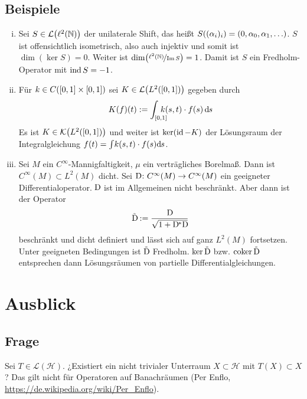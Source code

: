\subsection[Beispiele für Fredholm-Operatoren]{Beispiele} %
\label{sub:95}
\begin{enumerate}[(i)]
	\item Sei $S \in \mathcal{L}\enbrace*{\ell^2(\mathds{N})}$ der unilaterale Shift, das heißt
	$S \enbrace*{(\alpha_i)_i}= (0, \alpha_0, \alpha_1, \ldots )$. $S$ ist offensichtlich isometrisch, also auch injektiv und somit ist $\dim (\ker S)=0$. Weiter ist
	$\dim \enbrace*{\nicefrac{\ell^2(\mathds{N})}{\im S}} =1$. Damit ist $S$ ein Fredholm-Operator mit $\operatorname{ind} S = -1$.
	\item Für $k \in C \enbrace*{[0,1] \times [0,1]}$ sei $K \in \mathcal{L} \enbrace*{L^2([0,1])}$ gegeben durch
	\[
		K(f)(t) := \int_{[0,1]}\hspace{-1em} k(s,t)\cdot f(s)\,\mathrm{d}\mkern-1.0mu s
	\]
	Es ist $K \in \mathcal{K} \enbrace*{L^2([0,1])}$ und weiter ist $\ker(\operatorname{id}-K)$ der Lösungsraum der Integralgleichung $f(t)= \int \!k(s,t)\cdot f(s) \mathrm{d}\mkern-1.0mu s$.
	\item Sei $M$ ein $C^\infty$-Mannigfaltigkeit, $\mu$ ein verträgliches Borelmaß. Dann ist $C^\infty(M) \subset L^2(M)$ dicht. Sei $\mathrm{D}\mkern-1.5mu \colon C^\infty(M) \to C^\infty(M)$
	ein geeigneter Differentialoperator. $\mathrm{D}\mkern-1.5mu$ ist im Allgemeinen nicht beschränkt. Aber dann ist der Operator 
	\[
		\tilde{\mathrm{D}\mkern-1.5mu} := \frac{\mathrm{D}\mkern-1.5mu}{\sqrt{1+ \mathrm{D}\mkern-1.5mu^* \mathrm{D}\mkern-1.5mu}} 
	\]
	beschränkt und dicht definiert und lässt sich auf ganz $L^2(M)$ fortsetzen. Unter geeigneten Bedingungen ist $\tilde{\mathrm{D}\mkern-1.5mu}$ Fredholm. $\ker \tilde{\mathrm{D}\mkern-1.5mu}$ bzw. 
	$\operatorname{coker} \tilde{\mathrm{D}\mkern-1.5mu}$ entsprechen dann Lösungsräumen von partielle Differentialgleichungen.
\end{enumerate}

\section{Ausblick} %
\label{sec:10}

\subsection{Frage} %
\label{sub:101}
Sei $T \in \mathcal{L}(\mathcal{H})$. ¿Existiert ein nicht trivialer Unterraum $X \subset \mathcal{H}$ mit $T(X) \subset X$? Das gilt nicht für Operatoren auf Banachräumen 
(Per Enflo, \url{https://de.wikipedia.org/wiki/Per_Enflo}).


